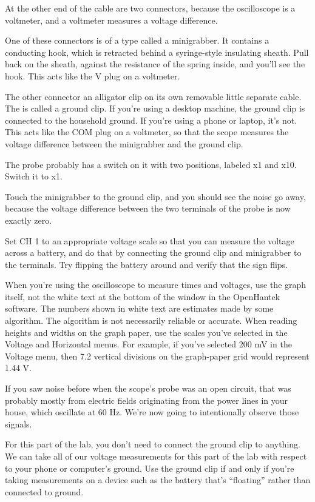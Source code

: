 At the other end of the cable are two
connectors, because the oscilloscope is a voltmeter, and a voltmeter measures
a voltage difference.

One of these connectors is of a type called a minigrabber.  It
contains a conducting hook, which is retracted behind a syringe-style
insulating sheath. Pull back on the sheath, against the resistance of
the spring inside, and you'll see the hook.  This acts like the V plug
on a voltmeter.

The other connector an alligator clip on its own removable little separate cable. The is called a ground
clip. If you're using a desktop machine, the ground clip
is connected to the household ground. If you're using a phone or laptop, it's not.
This acts like the COM plug on a voltmeter, so that the scope measures the voltage
difference between the minigrabber and the ground clip.

The probe probably has a switch on it with two positions, labeled x1 and x10.
Switch it to x1.

Touch the minigrabber to the ground clip, and you should see the noise go
away, because the voltage difference between the two terminals of the probe is now exactly zero.

Set CH 1 to an appropriate voltage scale so that you can measure the voltage across
a battery, and do that by connecting the ground clip and minigrabber to the terminals. Try flipping the battery around and verify that the sign flips.

When you're using the oscilloscope to measure times and	voltages, use
the graph itself, not the white text at the bottom of the window in
the OpenHantek software. The numbers shown in white text are estimates made by some
algorithm. The algorithm is not necessarily reliable or accurate. When
reading heights and widths on the graph paper, use the scales you've
selected in the Voltage and Horizontal menus. For example, if you've
selected 200 mV in the Voltage menu, then 7.2 vertical divisions on
the graph-paper grid would represent 1.44 V.


If you saw noise before when the scope's probe was an open circuit, that was probably
mostly from electric fields originating from the power lines in your house, which oscillate
at 60 Hz. We're now going to intentionally observe those signals.

For this part of the lab, you don't need to connect the ground clip to anything.
We can take all of our voltage measurements for this part of the lab
with respect to your phone or computer's ground. 
Use the ground clip if and only if you're taking measurements on a device such as the battery that's
``floating'' rather than connected to ground.

